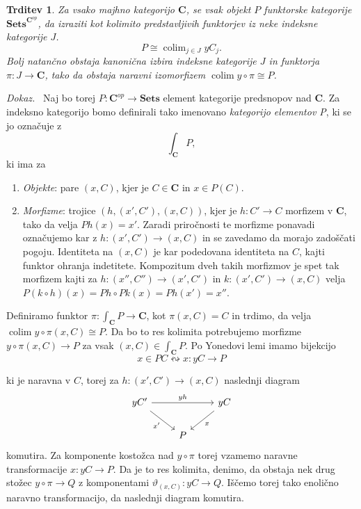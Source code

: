 \documentclass[12pt,a4paper]{book}
\theoremstyle{definition}
\theoremstyle{plain}
\newtheorem{trditev}[definicija]{Trditev}
\newenvironment{dokaz}{\emph{Dokaz.}\ }{\hspace{\fill}{$\Box$}}
\theoremstyle{definition}
\theoremstyle{remark}
\newcommand{\cat}[1]{\textbf{#1}}
\DeclareMathOperator{\colim}{colim}
\newcommand{\predsnop}[1]{\cat{Sets}^{\cat{#1}^{op}}}
\begin{document}
\begin{trditev}
\label{density theorem}
Za vsako majhno kategorijo $\cat{C}$, se vsak objekt $P$ funktorske kategorije $\predsnop{C}$, da izraziti kot kolimito predstavljivih funktorjev iz neke indeksne kategorije $J$.
$$ P \cong \colim_{j \in J} yC_j.$$
Bolj natančno obstaja kanonična izbira indeksne kategorije $J$ in funktorja $\pi : J \to \cat{C}$, tako da obstaja naravni izomorfizem $\colim y \circ \pi \cong P$.
\end{trditev}
\begin{dokaz}
Naj bo torej $P : \cat{C}^{op} \to \cat{Sets}$ element kategorije predsnopov nad $\cat{C}$. Za indeksno kategorijo bomo definirali tako imenovano \emph{kategorijo elementov P}, ki se jo označuje z
$$\int_{\cat{C}}P,$$
ki ima za
\begin{enumerate}
\item \emph{Objekte}: pare $(x,C)$, kjer je $C \in \cat{C}$ in $x \in P(C)$.
\item \emph{Morfizme}: trojice $(h, (x',C'), (x,C))$, kjer je $h : C' \to C$ morfizem v $\cat{C}$, tako da velja $Ph(x) = x'$. Zaradi priročnosti te morfizme ponavadi označujemo kar z $h : (x', C') \to (x,C)$ in se zavedamo da morajo zadoščati pogoju.
Identiteta na $(x,C)$ je kar podedovana identiteta na $C$, kajti funktor ohranja indetitete. Kompozitum dveh takih morfizmov je spet tak morfizem kajti za $h : (x'', C'') \to (x', C')$ in $k : (x', C') \to (x,C)$ velja $P(k \circ h)(x) = Ph \circ Pk(x) = Ph(x') = x''$.
\end{enumerate}

Definiramo funktor $\pi : \int_{\cat{C}}P \to \cat{C}$, kot $\pi(x,C) = C$ in trdimo, da velja $\colim y\circ \pi (x,C) \cong P$. Da bo to res kolimita potrebujemo morfizme $y\circ \pi (x,C) \to P$ za vsak $(x,C) \in \int_{\cat{C}}P$. Po Yonedovi lemi imamo bijekcijo
$$x \in PC \leftrightsquigarrow x:yC \to P$$

ki je naravna v $C$, torej za $h: (x',C') \to (x,C)$ naslednji diagram
$$ \begin{tikzcd}
yC' \ar[rr, "yh"] \ar[rd, "x'"'] & & yC \ar[ld, "x"] \\
& P &
\end{tikzcd} $$
komutira. Za komponente kostožca nad $y \circ \pi$ torej vzamemo naravne transformacije $x : yC \to P$. Da je to res kolimita, denimo, da obstaja nek drug stožec $y \circ \pi \to Q$ z komponentami $\vartheta_{(x,C)} : yC \to Q$. Iščemo torej tako enolično naravno transformacijo, da naslednji diagram komutira.


\end{dokaz}
\end{document}
